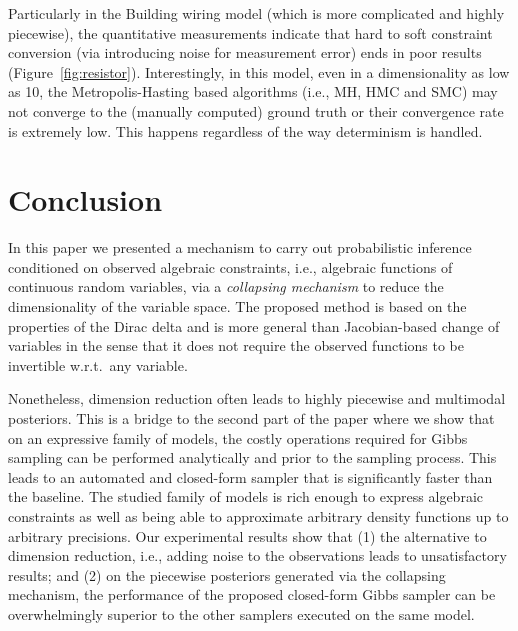 \documentclass[letterpaper]{article}
\begin{document}
Particularly in the Building wiring model (which is more complicated and highly piecewise), the quantitative measurements 
indicate that hard to soft constraint conversion (via introducing noise for measurement error) ends in poor results (Figure~\ref{fig:resistor}).
Interestingly, in this model, even in a dimensionality as low as 10, 
the Metropolis-Hasting based algorithms (i.e., MH, HMC and SMC) may not converge to the (manually computed) ground truth or their convergence rate is extremely low. 
This happens regardless of the way determinism is handled. 

\section{Conclusion}
\label{sect:conclusion}

In this paper we presented a mechanism to carry out probabilistic
inference conditioned on observed algebraic constraints, i.e., 
algebraic functions of continuous random variables, via
a \emph{collapsing mechanism} to reduce the dimensionality of the
variable space.  The proposed method is based on the properties of the
Dirac delta and is more general than Jacobian-based change of variables in
the sense that it does not require the observed functions to be
invertible w.r.t.\ any variable.

Nonetheless, dimension reduction often leads to highly piecewise and
multimodal posteriors.  This is a bridge to the second part of the
paper where we show that on an expressive family of models, the costly
operations required for Gibbs sampling can be performed analytically
and prior to the sampling process.  This leads to an automated and
closed-form sampler that is significantly faster than the baseline.
The studied family of models is rich enough to express algebraic
constraints as well as being able to approximate arbitrary density
functions up to arbitrary precisions.  Our experimental results show
that (1) the alternative to dimension reduction, i.e., adding noise to
the observations leads to unsatisfactory results; and 
(2) on the piecewise posteriors generated via the
collapsing mechanism, the performance of the proposed closed-form
Gibbs sampler can be overwhelmingly superior to the other samplers
executed on the same model.
\end{document}
